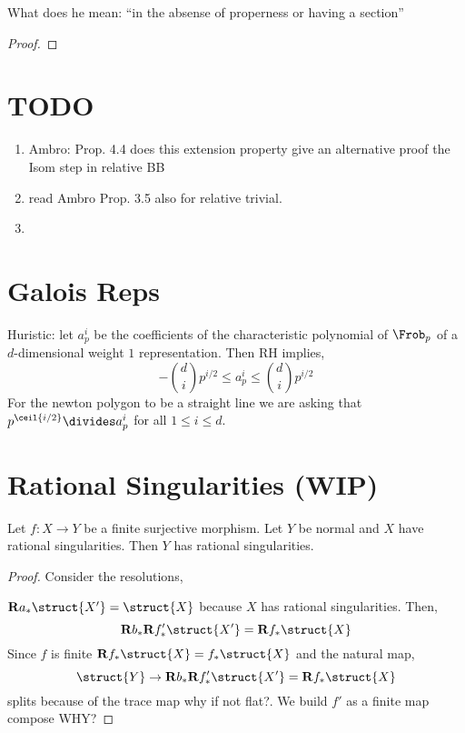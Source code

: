 \documentclass[12pt]{article}
\begin{document}
{\color{red} What does he mean: ``in the absense of properness or having a section''}

\begin{proof}

\end{proof}



\section{TODO}

\begin{enumerate}
\item Ambro: Prop. 4.4 does this extension property give an alternative proof the Isom step in relative BB
\item read Ambro Prop. 3.5 also for relative trivial. 

\item 
\end{enumerate}


\section{Galois Reps}

Huristic: let $a^i_p$ be the coefficients of the characteristic polynomial of $\Frob_p$ of a $d$-dimensional weight $1$ representation. Then RH implies,
\[ - {d \choose i} p^{i/2} \le a^i_p \le {d \choose i} p^{i/2} \]
For the newton polygon to be a straight line we are asking that $p^{\ceil{i/2}} \divides a^i_p$ for all $1 \le i \le d$.

\section{Rational Singularities (WIP)}

\begin{prop}
Let $f : X \to Y$ be a finite surjective morphism. Let $Y$ be normal and $X$ have rational singularities. Then $Y$ has rational singularities. 
\end{prop}

\begin{proof}
Consider the resolutions,
\begin{center}
\end{center}
$\R a_* \struct{X'} = \struct{X}$ because $X$ has rational singularities. Then,
\[ \R b_* \R f'_* \struct{X'} = \R f_* \struct{X} \]
Since $f$ is finite $\R f_* \struct{X} = f_* \struct{X}$ and the natural map,
\[ \struct{Y} \to \R b_* \R f'_* \struct{X'} = \R f_* \struct{X} \]
splits because of the trace map {\color{red} why if not flat?}. We build $f'$ as a finite map compose {\color{red} WHY?}
\end{proof}
\end{document}
